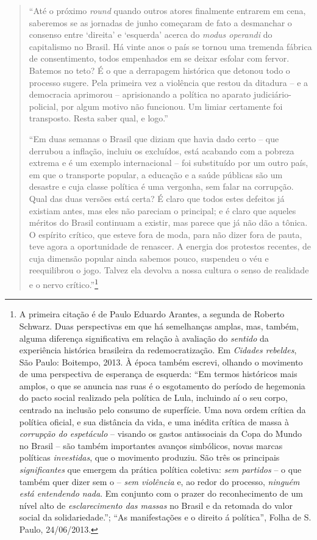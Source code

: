 \begin{quote}
``Até o próximo \emph{round} quando outros atores finalmente entrarem em
cena, saberemos se as jornadas de junho começaram de fato a desmanchar o
consenso entre `direita' e `esquerda' acerca do \emph{modus operandi} do
capitalismo no Brasil. Há vinte anos o país se tornou uma tremenda
fábrica de consentimento, todos empenhados em se deixar esfolar com
fervor. Batemos no teto? É o que a derrapagem histórica que detonou todo
o processo sugere. Pela primeira vez a violência que restou da ditadura
-- e a democracia aprimorou -- aprisionando a política no aparato
judiciário-policial, por algum motivo não funcionou. Um limiar
certamente foi transposto. Resta saber qual, e logo.''

\asterisc

``Em duas semanas o Brasil que diziam que havia dado certo -- que
derrubou a inflação, incluiu os excluídos, está acabando com a pobreza
extrema e é um exemplo internacional -- foi substituído por um outro
país, em que o transporte popular, a educação e a saúde públicas são um
desastre e cuja classe política é uma vergonha, sem falar na corrupção.
Qual das duas versões está certa? É claro que todos estes defeitos já
existiam antes, mas eles não pareciam o principal; e é claro que aqueles
méritos do Brasil continuam a existir, mas parece que já não dão a
tônica. O espírito crítico, que esteve fora de moda, para não dizer fora
de pauta, teve agora a oportunidade de renascer. A energia dos protestos
recentes, de cuja dimensão popular ainda sabemos pouco, suspendeu o véu
e reequilibrou o jogo. Talvez ela devolva a nossa cultura o senso de
realidade e o nervo crítico.''\footnote{A primeira citação é de Paulo
  Eduardo Arantes, a segunda de Roberto Schwarz. Duas perspectivas em
  que há semelhanças amplas, mas, também, alguma diferença significativa
  em relação à avaliação do \emph{sentido} da experiência histórica
  brasileira da redemocratização. Em \emph{Cidades rebeldes}, São Paulo:
  Boitempo, 2013. À época também escrevi, olhando o movimento de uma
  perspectiva de esperança de esquerda: ``Em termos históricos mais
  amplos, o que se anuncia nas ruas é o esgotamento do período de
  hegemonia do pacto social realizado pela política de Lula, incluindo
  aí o seu corpo, centrado na inclusão pelo consumo de superfície. Uma
  nova ordem crítica da política oficial, e sua distância da vida, e uma
  inédita crítica de massa à \emph{corrupção do espetáculo} -- visando
  os gastos antissociais da Copa do Mundo no Brasil -- são também
  importantes avanços simbólicos, novas marcas políticas
  \emph{investidas}, que o movimento produziu. São três os principais
  \emph{significantes} que emergem da prática política coletiva:
  \emph{sem partidos} -- o que também quer dizer sem o  -- \emph{sem
  violência} e, ao redor do processo, \emph{ninguém está entendendo
  nada}. Em conjunto com o prazer do reconhecimento de um nível alto de
  \emph{esclarecimento das massas} no Brasil e da retomada do valor
  social da solidariedade.''; ``As manifestações e o direito á
  política'', Folha de S. Paulo, 24/06/2013.}
\end{quote}


